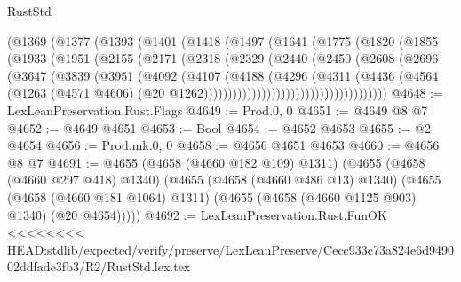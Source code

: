 \begin{lexlean}{RustStd}
\begin{coremodule}
{\begin{coremodule}
{{{{{{{{{{{{{{{{{{{{{{{{{{{{{{                (@1369
                  (@1377
                    (@1393
                      (@1401
                        (@1418
                          (@1497
                            (@1641
                              (@1775
                                (@1820
                                  (@1855
                                    (@1933
                                      (@1951
                                        (@2155
                                          (@2171
                                            (@2318
                                              (@2329
                                                (@2440
                                                  (@2450
                                                    (@2608
                                                      (@2696
                                                        (@3647
                                                          (@3839
                                                            (@3951
                                                              (@4092
                                                                (@4107
                                                                  (@4188
                                                                    (@4296
                                                                      (@4311
                                                                        (@4436
                                                                          (@4564
                                                                            (@1263
                                                                              (@4571 @4606)
                                                                              (@20
                                                                                @1262))))))))))))))))))))))))))))))))))))))
@4648 := LexLeanPreservation.Rust.Flags
@4649 := Prod.{0, 0}
@4651 := @4649 @8 @7
@4652 := @4649 @4651
@4653 := Bool
@4654 := @4652 @4653
@4655 := @2 @4654
@4656 := Prod.mk.{0, 0}
@4658 := @4656 @4651 @4653
@4660 := @4656 @8 @7
@4691 := @4655
    (@4658 (@4660 @182 @109) @1311)
    (@4655
      (@4658 (@4660 @297 @418) @1340)
      (@4655
        (@4658 (@4660 @486 @13) @1340)
        (@4655
          (@4658 (@4660 @181 @1064) @1311)
          (@4655 (@4658 (@4660 @1125 @903) @1340) (@20 @4654)))))
@4692 := LexLeanPreservation.Rust.FunOK
<<<<<<<< HEAD:stdlib/expected/verify/preserve/LexLeanPreserve/Cecc933c73a824e6d949002ddfade3fb3/R2/RustStd.lex.tex
}}}}}}}}}}}}}}}}}}}}}}}}}}}}}}
\end{coremodule}}
\end{coremodule}
\end{lexlean}
